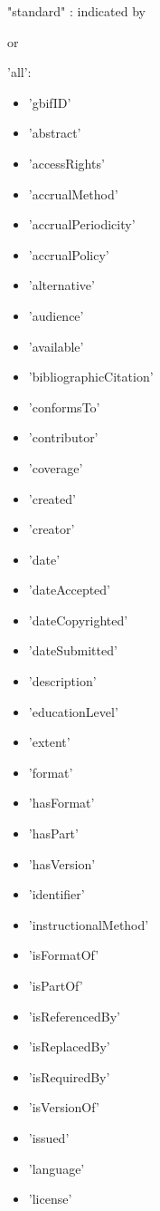 \documentclass[a4paper]{book}
\begin{document}
\begin{Details}
"standard" : indicated by 

or

'all':
\begin{itemize}

\item{} 'gbifID' 
\item{} 'abstract'
\item{} 'accessRights'
\item{} 'accrualMethod'
\item{} 'accrualPeriodicity'
\item{} 'accrualPolicy'
\item{} 'alternative'
\item{} 'audience'
\item{} 'available'
\item{} 'bibliographicCitation' 
\item{} 'conformsTo'
\item{} 'contributor'
\item{} 'coverage'
\item{} 'created'
\item{} 'creator'
\item{} 'date'
\item{} 'dateAccepted'
\item{} 'dateCopyrighted'
\item{} 'dateSubmitted'
\item{} 'description'
\item{} 'educationLevel'
\item{} 'extent'
\item{} 'format'
\item{} 'hasFormat'
\item{} 'hasPart'
\item{} 'hasVersion'
\item{} 'identifier'
\item{} 'instructionalMethod'
\item{} 'isFormatOf'
\item{} 'isPartOf'
\item{} 'isReferencedBy'
\item{} 'isReplacedBy'
\item{} 'isRequiredBy'
\item{} 'isVersionOf'
\item{} 'issued'
\item{} 'language' 
\item{} 'license'

\end{itemize}
\end{Details}
\end{document}
